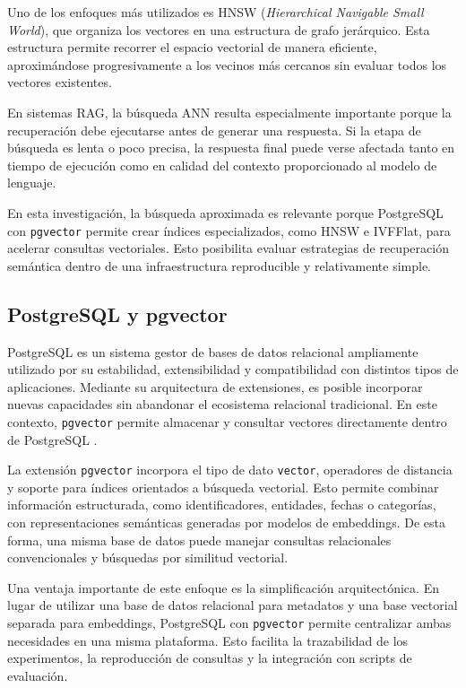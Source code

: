 Uno de los enfoques más utilizados es HNSW (\textit{Hierarchical Navigable Small World}), que organiza los vectores en una estructura de grafo jerárquico. Esta estructura permite recorrer el espacio vectorial de manera eficiente, aproximándose progresivamente a los vecinos más cercanos sin evaluar todos los vectores existentes.

En sistemas RAG, la búsqueda ANN resulta especialmente importante porque la recuperación debe ejecutarse antes de generar una respuesta. Si la etapa de búsqueda es lenta o poco precisa, la respuesta final puede verse afectada tanto en tiempo de ejecución como en calidad del contexto proporcionado al modelo de lenguaje.

En esta investigación, la búsqueda aproximada es relevante porque PostgreSQL con \texttt{pgvector} permite crear índices especializados, como HNSW e IVFFlat, para acelerar consultas vectoriales. Esto posibilita evaluar estrategias de recuperación semántica dentro de una infraestructura reproducible y relativamente simple.

\subsection{PostgreSQL y pgvector}

PostgreSQL es un sistema gestor de bases de datos relacional ampliamente utilizado por su estabilidad, extensibilidad y compatibilidad con distintos tipos de aplicaciones. Mediante su arquitectura de extensiones, es posible incorporar nuevas capacidades sin abandonar el ecosistema relacional tradicional. En este contexto, \texttt{pgvector} permite almacenar y consultar vectores directamente dentro de PostgreSQL \parencite{pgvector2024}.

La extensión \texttt{pgvector} incorpora el tipo de dato \texttt{vector}, operadores de distancia y soporte para índices orientados a búsqueda vectorial. Esto permite combinar información estructurada, como identificadores, entidades, fechas o categorías, con representaciones semánticas generadas por modelos de embeddings. De esta forma, una misma base de datos puede manejar consultas relacionales convencionales y búsquedas por similitud vectorial.

Una ventaja importante de este enfoque es la simplificación arquitectónica. En lugar de utilizar una base de datos relacional para metadatos y una base vectorial separada para embeddings, PostgreSQL con \texttt{pgvector} permite centralizar ambas necesidades en una misma plataforma. Esto facilita la trazabilidad de los experimentos, la reproducción de consultas y la integración con scripts de evaluación.

